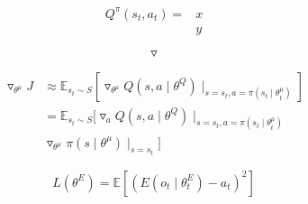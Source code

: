 \documentclass{article}
\begin{document}
\begin{equation}
  \begin{split}
     Q^{\pi}\left ( s_{t},a_{t} \right )=&x \\
   &y
  \end{split}
\end{equation}

\begin{equation}
  \triangledown
\end{equation}


\begin{equation}
\begin{split}
\triangledown_{\theta^{\mu}}J & \approx \mathbb{E}_{s_{t}\sim S}\left [ \triangledown _{\theta^{\mu}}Q\left ( s,a\mid\theta^{Q} \right )\mid_{s=s_{t},a=\pi\left ( s_{t}\mid\theta_{t}^{\mu } \right )} \right ]\\
&=\mathbb{E}_{s_{t}\sim S}[ \triangledown_{a}Q\left ( s,a\mid \theta^Q \right )\mid_{s=s_{t},a=\pi\left ( s_{t}\mid\theta_{t}^{\mu} \right )} \\
&\triangledown_{\theta^{\mu}}\pi\left ( s\mid\theta^{\mu} \right )\mid_{s=s_{t}}  ]
\end{split}
\end{equation}

\begin{equation}
  L\left ( \theta^{E} \right )=\mathbb{E}\left [ \left( E \left (o_{t}\mid\theta_{t}^{E} \right )-a_{t} \right )^2 \right]
\end{equation}
\end{document}
